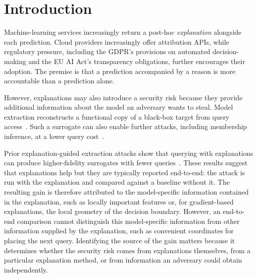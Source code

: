 \documentclass[sigconf,anonymous,review]{acmart}
\begin{document}
\maketitle

\section{Introduction}
Machine-learning services increasingly return a post-hoc \emph{explanation} alongside each
prediction. Cloud providers increasingly offer attribution APIs, while regulatory pressure, including the GDPR's provisions on automated decision-making and the EU AI Act's transparency obligations, further encourages their adoption. The premise is that a prediction
accompanied by a reason is more accountable than a prediction alone.

However, explanations may also introduce a security risk because they provide additional information about the model an adversary wants to steal. Model extraction reconstructs a functional copy of a
black-box target from query access~\cite{tramer2016stealing,jagielski2020high}. Such a surrogate can also enable further attacks, including membership inference, at a lower query cost~\cite{oksuz2026lomime}. 

Prior explanation-guided extraction attacks show that querying with explanations can produce higher-fidelity surrogates with fewer queries~\cite{oksuz2024autolycus,milli2019model,aivodji2020model}.
These results suggest that explanations help but they are typically reported end-to-end: the
attack is run with the explanation and compared against a baseline without it. The resulting gain is therefore attributed to the model-specific information contained in the explanation, such as locally important features or, for gradient-based explanations, the local geometry of the decision boundary. However, an end-to-end comparison cannot distinguish this model-specific information from other information supplied by the explanation, such as convenient coordinates for placing the next query. Identifying the source of the gain matters because it determines whether the security risk comes from explanations themselves, from a particular explanation method, or from information an adversary could obtain independently.
\end{document}
